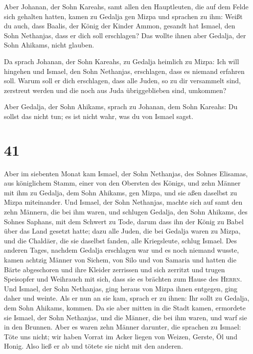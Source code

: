  Aber Johanan, der Sohn Kareahs, samt allen den
Hauptleuten, die auf dem Felde sich gehalten hatten, kamen zu Gedalja
gen Mizpa  und sprachen zu ihm: Weißt du auch, dass
Baalis, der König der Kinder Ammon, gesandt hat Ismael, den Sohn
Nethanjas, dass er dich soll erschlagen? Das wollte ihnen aber Gedalja,
der Sohn Ahikams, nicht glauben.

 Da sprach Johanan, der Sohn Kareahs, zu Gedalja heimlich
zu Mizpa: Ich will hingehen und Ismael, den Sohn Nethanjas, erschlagen,
dass es niemand erfahren soll. Warum soll er dich erschlagen, dass alle
Juden, so zu dir versammelt sind, zerstreut werden und die noch aus Juda
übriggeblieben sind, umkommen?

 Aber Gedalja, der Sohn Ahikams, sprach zu Johanan, dem
Sohn Kareahs: Du sollst das nicht tun; es ist nicht wahr, was du von
Ismael sagst.

\hypertarget{section-40}{%
\section{41}\label{section-40}}

 Aber im siebenten Monat kam Ismael, der Sohn Nethanjas,
des Sohnes Elisamas, aus königlichem Stamm, einer von den Obersten des
Königs, und zehn Männer mit ihm zu Gedalja, dem Sohn Ahikams, gen Mizpa,
und sie aßen daselbst zu Mizpa miteinander.  Und Ismael,
der Sohn Nethanjas, machte sich auf samt den zehn Männern, die bei ihm
waren, und schlugen Gedalja, den Sohn Ahikams, des Sohnes Saphans, mit
dem Schwert zu Tode, darum dass ihn der König zu Babel über das Land
gesetzt hatte;  dazu alle Juden, die bei Gedalja waren zu
Mizpa, und die Chaldäer, die sie daselbst fanden, alle Kriegsleute,
schlug Ismael.  Des anderen Tages, nachdem Gedalja
erschlagen war und es noch niemand wusste,  kamen achtzig
Männer von Sichem, von Silo und von Samaria und hatten die Bärte
abgeschoren und ihre Kleider zerrissen und sich zerritzt und trugen
Speisopfer und Weihrauch mit sich, dass sie es brächten zum Hause des
\textsc{Herrn}.  Und Ismael, der Sohn Nethanjas, ging
heraus von Mizpa ihnen entgegen, ging daher und weinte. Als er nun an
sie kam, sprach er zu ihnen: Ihr sollt zu Gedalja, dem Sohn Ahikams,
kommen.  Da sie aber mitten in die Stadt kamen, ermordete
sie Ismael, der Sohn Nethanjas, und die Männer, die bei ihm waren, und
warf sie in den Brunnen.  Aber es waren zehn Männer
darunter, die sprachen zu Ismael: Töte uns nicht; wir haben Vorrat im
Acker liegen von Weizen, Gerste, Öl und Honig. Also ließ er ab und
tötete sie nicht mit den anderen.

